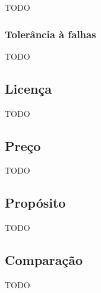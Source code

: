 TODO

\subsubsection{Tolerância à falhas}

TODO

\subsection{Licença}

TODO

\subsection{Preço}

TODO

\subsection{Propósito}

TODO

\subsection{Comparação}

TODO
